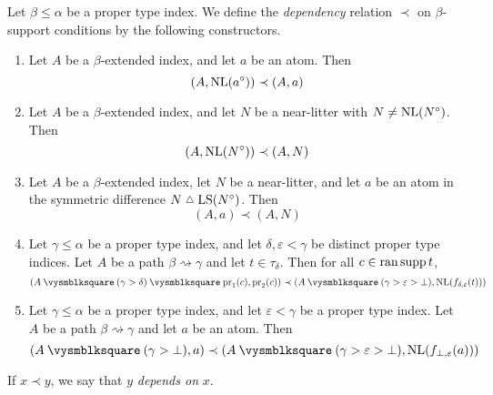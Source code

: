 \begin{definition}
    \label{def:dependency}
    Let \( \beta \leq \alpha \) be a proper type index.
    We define the \emph{dependency} relation \( \prec \) on \( \beta \)-support conditions by the following constructors.
    \begin{enumerate}
        \item Let \( A \) be a \( \beta \)-extended index, and let \( a \) be an atom.
        Then
        \[ (A, \operatorname{NL}(a^\circ)) \prec (A, a) \]
        \item Let \( A \) be a \( \beta \)-extended index, and let \( N \) be a near-litter with \( N \neq \operatorname{NL}(N^\circ) \).
        Then
        \[ (A, \operatorname{NL}(N^\circ)) \prec (A, N) \]
        \item Let \( A \) be a \( \beta \)-extended index, let \( N \) be a near-litter, and let \( a \) be an atom in the symmetric difference \( N \symmdiff \LS(N^\circ) \).
        Then
        \[ (A, a) \prec (A, N) \]
        \item Let \( \gamma \leq \alpha \) be a proper type index, and let \( \delta, \varepsilon < \gamma \) be distinct proper type indices.
        Let \( A \) be a path \( \beta \rightsquigarrow \gamma \) and let \( t \in \tau_\delta \).
        Then for all \( c \in \operatorname{ran} \operatorname{supp} t \),
        \[ (A \pcomp (\gamma > \delta) \pcomp \pr_1(c), \pr_2(c)) \prec (A \pcomp (\gamma > \varepsilon > \bot), \NL(f_{\delta,\varepsilon}(t))) \]
        \item Let \( \gamma \leq \alpha \) be a proper type index, and let \( \varepsilon < \gamma \) be a proper type index.
        Let \( A \) be a path \( \beta \rightsquigarrow \gamma \) and let \( a \) be an atom.
        Then
        \[ (A \pcomp (\gamma > \bot), a) \prec (A \pcomp (\gamma > \varepsilon > \bot), \NL(f_{\bot,\varepsilon}(a))) \]
    \end{enumerate}
    If \( x \prec y \), we say that \( y \) \emph{depends on} \( x \).
\end{definition}

